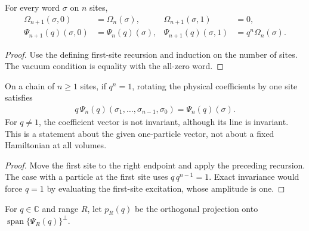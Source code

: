 \begin{lemma}
    \label{lem:pvbs_right_endpoint_coefficients}
    \leanok
    For every word $\sigma$ on $n$ sites,
    \begin{align}
        \Omega_{n+1}(\sigma,0)  & =\Omega_n(\sigma),
                                & \Omega_{n+1}(\sigma,1)  & =0,                   \\
        \Psi_{n+1}(q)(\sigma,0) & =\Psi_n(q)(\sigma),
                                & \Psi_{n+1}(q)(\sigma,1) & =q^n\Omega_n(\sigma).
    \end{align}
\end{lemma}
\begin{proof}
    \leanok
    Use the defining first-site recursion and induction on the number
    of sites. The vacuum condition is equality with the all-zero word.
\end{proof}

\begin{lemma}
    \label{lem:pvbs_geometric_cyclic_phase}
    \leanok
    On a chain of $n\ge1$ sites, if $q^n=1$, rotating the physical
    coefficients by one site satisfies
    \begin{align}
        q\,\Psi_n(q)(\sigma_1,\ldots,\sigma_{n-1},\sigma_0)=\Psi_n(q)(\sigma).
    \end{align}
    For $q\ne1$, the coefficient vector is not invariant,
    although its line is invariant. This is a statement about the
    given one-particle vector, not about a fixed Hamiltonian at all volumes.
\end{lemma}
\begin{proof}
    \leanok
    Move the first site to the right endpoint and apply the preceding
    recursion. The case with a particle at the first site uses
    $q\,q^{n-1}=1$. Exact invariance would force $q=1$ by evaluating the
    first-site excitation, whose amplitude is one.
\end{proof}

\begin{definition}
    \label{def:pvbs_pure_window_interaction}
    \leanok
    For $q\in\mathbb C$ and range $R$, let $p_R(q)$ be the orthogonal
    projection onto $\operatorname{span}\{\Psi_R(q)\}^{\perp}$.
\end{definition}

